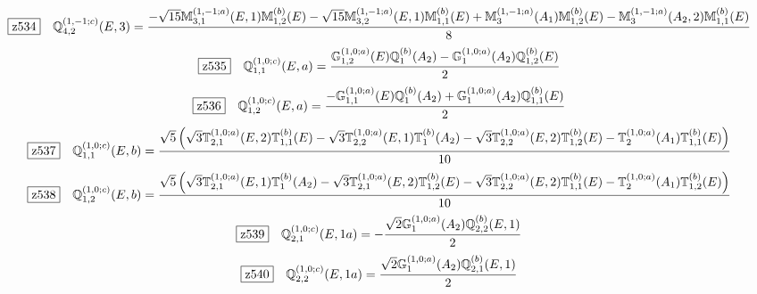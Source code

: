 \documentclass[fleqn,10pt,landscape]{jsarticle}
\begin{document}
\begin{dmath*}
\hspace*{3mm}\fbox{z534}\quad \mathbb{Q}_{4,2}^{(1,-1;c)}(E,3)=\frac{- \sqrt{15} \mathbb{M}_{3,1}^{(1,-1;a)}(E,1) \mathbb{M}_{1,2}^{(b)}(E) - \sqrt{15} \mathbb{M}_{3,2}^{(1,-1;a)}(E,1) \mathbb{M}_{1,1}^{(b)}(E) + \mathbb{M}_{3}^{(1,-1;a)}(A_{1}) \mathbb{M}_{1,2}^{(b)}(E) - \mathbb{M}_{3}^{(1,-1;a)}(A_{2},2) \mathbb{M}_{1,1}^{(b)}(E)}{8}
\end{dmath*}
\begin{dmath*}
\hspace*{3mm}\fbox{z535}\quad \mathbb{Q}_{1,1}^{(1,0;c)}(E,a)=\frac{\mathbb{G}_{1,2}^{(1,0;a)}(E) \mathbb{Q}_{1}^{(b)}(A_{2}) - \mathbb{G}_{1}^{(1,0;a)}(A_{2}) \mathbb{Q}_{1,2}^{(b)}(E)}{2}
\end{dmath*}
\begin{dmath*}
\hspace*{3mm}\fbox{z536}\quad \mathbb{Q}_{1,2}^{(1,0;c)}(E,a)=\frac{- \mathbb{G}_{1,1}^{(1,0;a)}(E) \mathbb{Q}_{1}^{(b)}(A_{2}) + \mathbb{G}_{1}^{(1,0;a)}(A_{2}) \mathbb{Q}_{1,1}^{(b)}(E)}{2}
\end{dmath*}
\begin{dmath*}
\hspace*{3mm}\fbox{z537}\quad \mathbb{Q}_{1,1}^{(1,0;c)}(E,b)=\frac{\sqrt{5} \left(\sqrt{3} \mathbb{T}_{2,1}^{(1,0;a)}(E,2) \mathbb{T}_{1,1}^{(b)}(E) - \sqrt{3} \mathbb{T}_{2,2}^{(1,0;a)}(E,1) \mathbb{T}_{1}^{(b)}(A_{2}) - \sqrt{3} \mathbb{T}_{2,2}^{(1,0;a)}(E,2) \mathbb{T}_{1,2}^{(b)}(E) - \mathbb{T}_{2}^{(1,0;a)}(A_{1}) \mathbb{T}_{1,1}^{(b)}(E)\right)}{10}
\end{dmath*}
\begin{dmath*}
\hspace*{3mm}\fbox{z538}\quad \mathbb{Q}_{1,2}^{(1,0;c)}(E,b)=\frac{\sqrt{5} \left(\sqrt{3} \mathbb{T}_{2,1}^{(1,0;a)}(E,1) \mathbb{T}_{1}^{(b)}(A_{2}) - \sqrt{3} \mathbb{T}_{2,1}^{(1,0;a)}(E,2) \mathbb{T}_{1,2}^{(b)}(E) - \sqrt{3} \mathbb{T}_{2,2}^{(1,0;a)}(E,2) \mathbb{T}_{1,1}^{(b)}(E) - \mathbb{T}_{2}^{(1,0;a)}(A_{1}) \mathbb{T}_{1,2}^{(b)}(E)\right)}{10}
\end{dmath*}
\begin{dmath*}
\hspace*{3mm}\fbox{z539}\quad \mathbb{Q}_{2,1}^{(1,0;c)}(E,1a)=- \frac{\sqrt{2} \mathbb{G}_{1}^{(1,0;a)}(A_{2}) \mathbb{Q}_{2,2}^{(b)}(E,1)}{2}
\end{dmath*}
\begin{dmath*}
\hspace*{3mm}\fbox{z540}\quad \mathbb{Q}_{2,2}^{(1,0;c)}(E,1a)=\frac{\sqrt{2} \mathbb{G}_{1}^{(1,0;a)}(A_{2}) \mathbb{Q}_{2,1}^{(b)}(E,1)}{2}
\end{dmath*}
\end{document}
